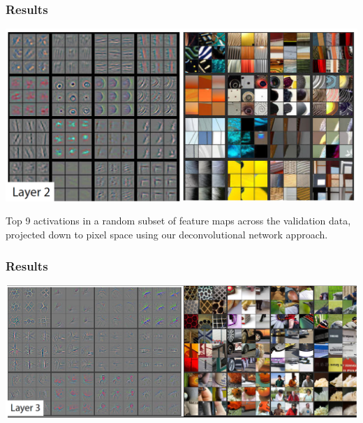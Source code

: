 \begin{frame}
	\frametitle{Results}

\begin{center}
	\includegraphics[scale=0.7]{figs/ZFnet_layer2}
\end{center}

Top 9 activations in a random subset
of feature maps across the validation data, projected down to pixel space using our deconvolutional network approach.
\end{frame}

\begin{frame}
	\frametitle{Results}

	\begin{center}
		\includegraphics[scale=0.5]{figs/ZFnet_layer3}
	\end{center}
\end{frame}


